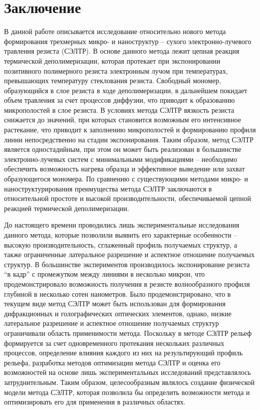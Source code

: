 \chapter*{Заключение}

В данной работе описывается исследование относительно нового метода формирования трехмерных микро- и наноструктур -- сухого электронно-лучевого травления резиста (СЭЛТР). В основе данного метода лежит цепная реакция термической деполимеризации, которая протекает при экспонировании позитивного полимерного резиста электронным лучом при температурах, превышающих температуру стеклования резиста. Свободный мономер, образующийся в слое резиста в ходе деполимеризации, в дальнейшем покидает объем травления за счет процессов диффузии, что приводит к образованию микрополостей в слое резиста. В условиях метода СЭЛТР вязкость резиста снижается до значений, при которых становится возможным его интенсивное растекание, что приводит к заполнению микрополостей и формированию профиля линии непосредственно на стадии экспонирования. Таким образом, метод СЭЛТР является одностадийным, при этом он может быть реализован в большинстве электронно-лучевых систем с минимальными модификациями -- необходимо обеспечить возможность нагрева образца и эффективное выведение или захват образующегося мономера. По сравнению с существующими методами микро- и наноструктурирования преимущества метода СЭЛТР заключаются в относительной простоте и высокой производительности, обеспечиваемой цепной реакцией термической деполимеризации.

До настоящего времени проводились лишь экспериментальные исследования данного метода, которые позволили выявить его характерные особенности -- высокую производительность, сглаженный профиль получаемых структур, а также ограниченные латеральное разрешение и аспектное отношение получаемых структур. В большинстве экспериментов производилось экспонирование резиста ``в кадр'' с промежутком между линиями в несколько микрон, что продемонстрировало возможность получения в резисте волнообразного профиля глубиной в несколько сотен нанометров. Было продемонстрировано, что в текущем виде метод СЭЛТР может быть использован для формирования дифракционных и голографических оптических элементов, однако, низкие латеральное разрешение и аспектное отношение получаемых структур ограничивали область применимости метода. Поскольку в методе СЭЛТР рельеф формируется за счет одновременного протекания нескольких различных процессов, определение влияния каждого из них на результирующий профиль рельефа, разработка методов оптимизации метода СЭЛТР и оценка его возможностей на основе лишь экспериментальных исследований представлялось затруднительным. Таким образом, целесообразным являлось создание физической модели метода СЭЛТР, которая позволила бы определить возможности метода и оптимизировать его для применения в различных областях.

